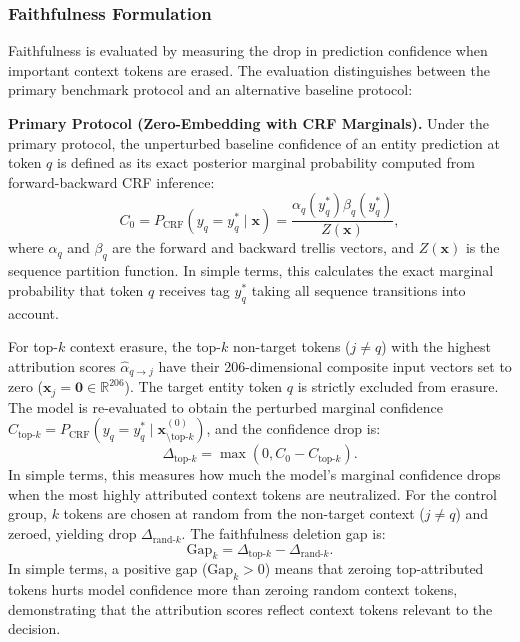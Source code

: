 \documentclass[pdflatex,sn-mathphys-num]{sn-jnl}
\begin{document}
\subsubsection{Faithfulness Formulation}
Faithfulness is evaluated by measuring the drop in prediction confidence when important context tokens are erased. The evaluation distinguishes between the primary benchmark protocol and an alternative baseline protocol:

\textbf{Primary Protocol (Zero-Embedding with CRF Marginals).} Under the primary protocol, the unperturbed baseline confidence of an entity prediction at token $q$ is defined as its exact posterior marginal probability computed from forward-backward CRF inference:
\begin{equation}
C_0 = P_{\text{CRF}}(y_q = y^*_q \mid \mathbf{x}) = \frac{\alpha_q(y^*_q) \beta_q(y^*_q)}{Z(\mathbf{x})},
\end{equation}
where $\alpha_q$ and $\beta_q$ are the forward and backward trellis vectors, and $Z(\mathbf{x})$ is the sequence partition function. In simple terms, this calculates the exact marginal probability that token $q$ receives tag $y^*_q$ taking all sequence transitions into account. 

For top-$k$ context erasure, the top-$k$ non-target tokens ($j \neq q$) with the highest attribution scores $\hat{\alpha}_{q \to j}$ have their 206-dimensional composite input vectors set to zero ($\mathbf{x}_j = \mathbf{0} \in \mathbb{R}^{206}$). The target entity token $q$ is strictly excluded from erasure. The model is re-evaluated to obtain the perturbed marginal confidence $C_{\text{top-}k} = P_{\text{CRF}}(y_q = y^*_q \mid \mathbf{x}_{\setminus \text{top-}k}^{(0)})$, and the confidence drop is:
\begin{equation}
\Delta_{\text{top-}k} = \max(0, C_0 - C_{\text{top-}k}).
\end{equation}
In simple terms, this measures how much the model's marginal confidence drops when the most highly attributed context tokens are neutralized. For the control group, $k$ tokens are chosen at random from the non-target context ($j \neq q$) and zeroed, yielding drop $\Delta_{\text{rand-}k}$. The faithfulness deletion gap is:
\begin{equation}
\text{Gap}_k = \Delta_{\text{top-}k} - \Delta_{\text{rand-}k}.
\end{equation}
In simple terms, a positive gap ($\text{Gap}_k > 0$) means that zeroing top-attributed tokens hurts model confidence more than zeroing random context tokens, demonstrating that the attribution scores reflect context tokens relevant to the decision.
\end{document}
